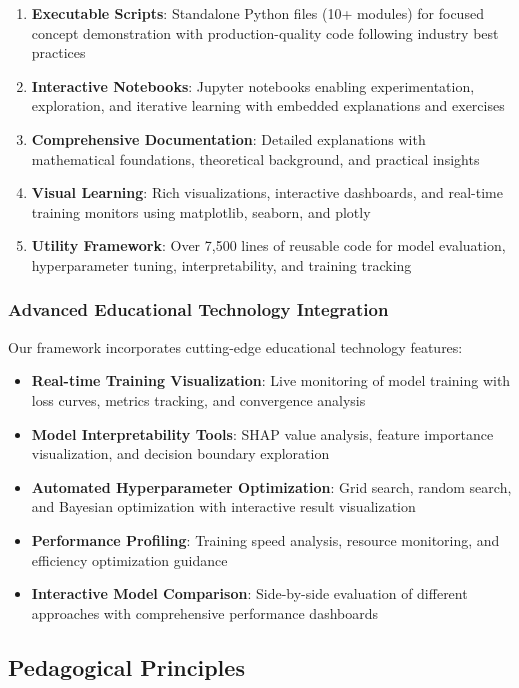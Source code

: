 \begin{enumerate}
    \item \textbf{Executable Scripts}: Standalone Python files (10+ modules) for focused concept demonstration with production-quality code following industry best practices
    \item \textbf{Interactive Notebooks}: Jupyter notebooks enabling experimentation, exploration, and iterative learning with embedded explanations and exercises
    \item \textbf{Comprehensive Documentation}: Detailed explanations with mathematical foundations, theoretical background, and practical insights
    \item \textbf{Visual Learning}: Rich visualizations, interactive dashboards, and real-time training monitors using matplotlib, seaborn, and plotly
    \item \textbf{Utility Framework}: Over 7,500 lines of reusable code for model evaluation, hyperparameter tuning, interpretability, and training tracking
\end{enumerate}

\subsubsection{Advanced Educational Technology Integration}

Our framework incorporates cutting-edge educational technology features:

\begin{itemize}
    \item \textbf{Real-time Training Visualization}: Live monitoring of model training with loss curves, metrics tracking, and convergence analysis
    \item \textbf{Model Interpretability Tools}: SHAP value analysis, feature importance visualization, and decision boundary exploration
    \item \textbf{Automated Hyperparameter Optimization}: Grid search, random search, and Bayesian optimization with interactive result visualization
    \item \textbf{Performance Profiling}: Training speed analysis, resource monitoring, and efficiency optimization guidance
    \item \textbf{Interactive Model Comparison}: Side-by-side evaluation of different approaches with comprehensive performance dashboards
\end{itemize}

\subsection{Pedagogical Principles}

